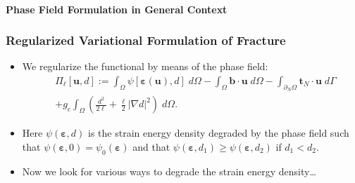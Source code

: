 \documentclass{beamer}
\newcommand{\SectionTwo}{Phase Field Formulation in General Context}
\begin{document}
%

\begin{frame}
	\framesubtitle{\SectionTwo}
	\frametitle{Regularized Variational Formulation of Fracture}
	\begin{itemize}
		\setlength\itemsep{2em}
		\item We regularize the functional by means of the phase field:
		\begin{align*}
		&\Pi_\ell[\bm{u}, d] := \int_\Omega \psi[\bm{\varepsilon}(\bm{u}), d] \;d\Omega - \int_\Omega \mathbf{b}\cdot\bm{u} \; d\Omega - \int_{\partial_N\Omega} \bm{t}_N\cdot \bm{u} \; d\Gamma\\ 
		&+ {g_c}\int_\Omega \left(\frac{d^2}{2\ell} + \frac{\ell}{2} |\nabla d|^2\right)\;d\Omega.
		\end{align*}
		\item Here $\psi(\bm{\varepsilon}, d)$ is the strain energy density degraded by the phase field such that
		$\psi(\bm{\varepsilon}, 0) = \psi_0(\bm{\varepsilon})$ and that $\psi(\bm{\varepsilon}, d_1)\ge \psi(\bm{\varepsilon}, d_2)$ if $d_1<d_2$.
		\item Now we look for various ways to degrade the strain energy density\ldots
	\end{itemize}
\end{frame}
\end{document}
